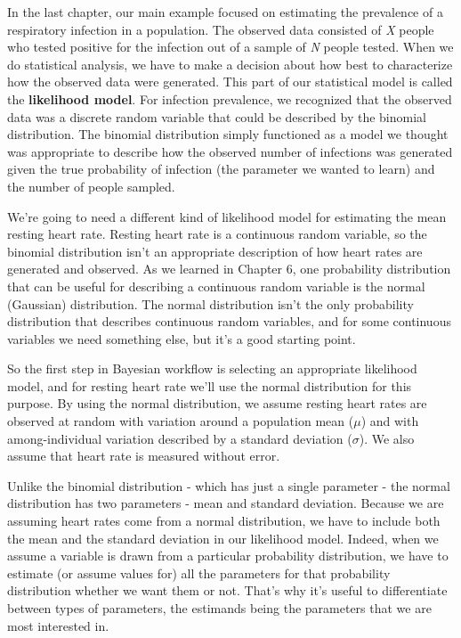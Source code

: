 \documentclass[
]{book}
\begin{document}
In the last chapter, our main example focused on estimating the prevalence of a respiratory infection in a population. The observed data consisted of \emph{X} people who tested positive for the infection out of a sample of \emph{N} people tested. When we do statistical analysis, we have to make a decision about how best to characterize how the observed data were generated. This part of our statistical model is called the \textbf{likelihood model}. For infection prevalence, we recognized that the observed data was a discrete random variable that could be described by the binomial distribution. The binomial distribution simply functioned as a model we thought was appropriate to describe how the observed number of infections was generated given the true probability of infection (the parameter we wanted to learn) and the number of people sampled.

We're going to need a different kind of likelihood model for estimating the mean resting heart rate. Resting heart rate is a continuous random variable, so the binomial distribution isn't an appropriate description of how heart rates are generated and observed. As we learned in Chapter 6, one probability distribution that can be useful for describing a continuous random variable is the normal (Gaussian) distribution. The normal distribution isn't the only probability distribution that describes continuous random variables, and for some continuous variables we need something else, but it's a good starting point.

So the first step in Bayesian workflow is selecting an appropriate likelihood model, and for resting heart rate we'll use the normal distribution for this purpose. By using the normal distribution, we assume resting heart rates are observed at random with variation around a population mean (\(\mu\)) and with among-individual variation described by a standard deviation (\(\sigma\)). We also assume that heart rate is measured without error.

Unlike the binomial distribution - which has just a single parameter - the normal distribution has two parameters - mean and standard deviation. Because we are assuming heart rates come from a normal distribution, we have to include both the mean and the standard deviation in our likelihood model. Indeed, when we assume a variable is drawn from a particular probability distribution, we have to estimate (or assume values for) all the parameters for that probability distribution whether we want them or not. That's why it's useful to differentiate between types of parameters, the estimands being the parameters that we are most interested in.
\end{document}
